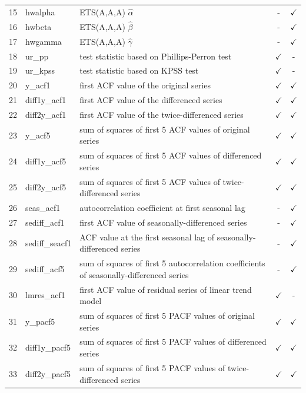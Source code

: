 \documentclass[11pt,a4paper,]{article}
\def\yes{$\checkmark$}
\theoremstyle{definition}
\theoremstyle{definition}
\theoremstyle{definition}
\theoremstyle{remark}
\begin{document}
\begin{table}[!htp]
\begin{tabular}{llp{}cc}
15 & hwalpha        & ETS(A,A,A) $\hat\alpha$                                                                 & -     & \yes \\
16 & hwbeta         & ETS(A,A,A) $\hat\beta$                                                                  & -     & \yes \\
17 & hwgamma        & ETS(A,A,A) $\hat\gamma$                                                                 & -     & \yes \\
18 & ur\_pp         & test statistic based on Phillips-Perron test                                            & \yes  & - \\
19 & ur\_kpss       & test statistic based on KPSS test                                                       & \yes  & - \\
20 & y\_acf1        & first ACF value of the original series                                                  & \yes  & \yes \\
21 & diff1y\_acf1   & first ACF value of the differenced series                                               & \yes  & \yes \\
22 & diff2y\_acf1   & first ACF value of the twice-differenced series                                         & \yes  & \yes \\
23 & y\_acf5        & sum of squares of first 5 ACF values of original series                                 & \yes  & \yes \\
24 & diff1y\_acf5   & sum of squares of first 5 ACF values of differenced series                              & \yes  & \yes \\
25 & diff2y\_acf5   & sum of squares of first 5 ACF values of twice-differenced series                        & \yes  & \yes \\
26 & seas\_acf1     & autocorrelation coefficient at first seasonal lag                                       & -     & \yes \\
27 & sediff\_acf1   & first ACF value of seasonally-differenced series                                        & -     & \yes\\
28 & sediff\_seacf1 & ACF value at the first seasonal lag of seasonally-differenced series                    & -     & \yes \\
29 & sediff\_acf5   & sum of squares of first 5 autocorrelation coefficients of seasonally-differenced series & -     & \yes \\
30 & lmres\_acf1    & first ACF value of residual series of linear trend model                                & \yes  & - \\
31 & y\_pacf5       & sum of squares of first 5 PACF values of original series                                & \yes  & \yes \\
32 & diff1y\_pacf5  & sum of squares of first 5 PACF values of differenced series                             & \yes  & \yes \\
33 & diff2y\_pacf5  & sum of squares of first 5 PACF values of twice-differenced series                       & \yes  & \yes \\
\bottomrule
 \end{tabular}
\end{table}
\end{document}
